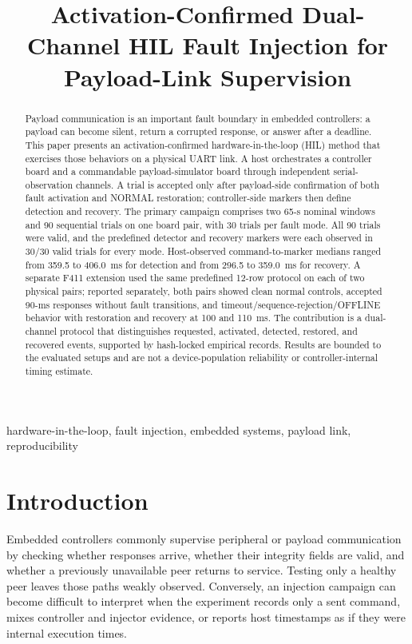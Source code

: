 \documentclass[conference]{IEEEtran}
\title{Activation-Confirmed Dual-Channel HIL Fault Injection for Payload-Link Supervision}
\author{}
\begin{document}
\maketitle

\begin{abstract}
Payload communication is an important fault boundary in embedded controllers: a payload can become silent, return a corrupted response, or answer after a deadline. This paper presents an activation-confirmed hardware-in-the-loop (HIL) method that exercises those behaviors on a physical UART link. A host orchestrates a controller board and a commandable payload-simulator board through independent serial-observation channels. A trial is accepted only after payload-side confirmation of both fault activation and NORMAL restoration; controller-side markers then define detection and recovery. The primary campaign comprises two 65-s nominal windows and 90 sequential trials on one board pair, with 30 trials per fault mode. All 90 trials were valid, and the predefined detector and recovery markers were each observed in 30/30 valid trials for every mode. Host-observed command-to-marker medians ranged from 359.5 to 406.0~ms for detection and from 296.5 to 359.0~ms for recovery. A separate F411 extension used the same predefined 12-row protocol on each of two physical pairs; reported separately, both pairs showed clean normal controls, accepted 90-ms responses without fault transitions, and timeout/sequence-rejection/OFFLINE behavior with restoration and recovery at 100 and 110~ms. The contribution is a dual-channel protocol that distinguishes requested, activated, detected, restored, and recovered events, supported by hash-locked empirical records. Results are bounded to the evaluated setups and are not a device-population reliability or controller-internal timing estimate.
\end{abstract}

\begin{IEEEkeywords}
hardware-in-the-loop, fault injection, embedded systems, payload link, reproducibility
\end{IEEEkeywords}

\section{Introduction}

Embedded controllers commonly supervise peripheral or payload communication by checking whether responses arrive, whether their integrity fields are valid, and whether a previously unavailable peer returns to service. Testing only a healthy peer leaves those paths weakly observed. Conversely, an injection campaign can become difficult to interpret when the experiment records only a sent command, mixes controller and injector evidence, or reports host timestamps as if they were internal execution times.
\end{document}
